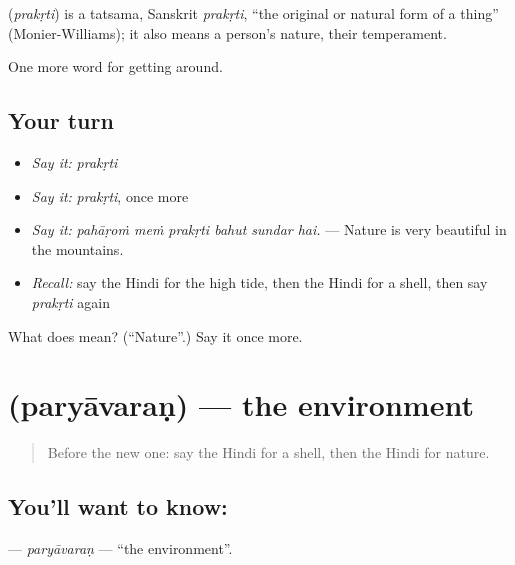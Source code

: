 \begin{cousinweb}
\textbf{} (\emph{prakṛti}) is a tatsama, Sanskrit \emph{prakṛti}, \textquotedblleft{}the original or natural form of a thing\textquotedblright{} (Monier-Williams); it also means a person's nature, their temperament.
\end{cousinweb}

\begin{grammarlens}[title={What you've built}]
One more word for getting around.
\end{grammarlens}

\subsection*{Your turn}
\begin{itemize}
\raggedright
  \item \emph{Say it:} \emph{prakṛti}
  \item \emph{Say it:} \emph{prakṛti}, once more
  \item \emph{Say it:} \emph{pahāṛoṁ meṁ prakṛti bahut sundar hai.} — Nature is very beautiful in the mountains.
  \item \emph{Recall:} say the Hindi for the high tide, then the Hindi for a shell, then say \emph{prakṛti} again
\end{itemize}

\begin{tcolorbox}[breakable,colback=teal!4,colframe=teal!35!black,title={Before you move on}]
What does  mean? (\textquotedblleft{}Nature\textquotedblright{}.) Say it once more.
\end{tcolorbox}
\section[\texorpdfstring{\hi{पर्यावरण} (paryāvaraṇ)}{पर्यावरण (paryāvaraṇ)}]{ (paryāvaraṇ) — the environment}

\label{lesson:HI-C446-paryavaran}



\begin{quote}
Before the new one: say the Hindi for a shell, then the Hindi for nature.
\end{quote}

\subsection*{You'll want to know: }
\textbf{} — \emph{paryāvaraṇ} — \textquotedblleft{}the environment\textquotedblright{}.

